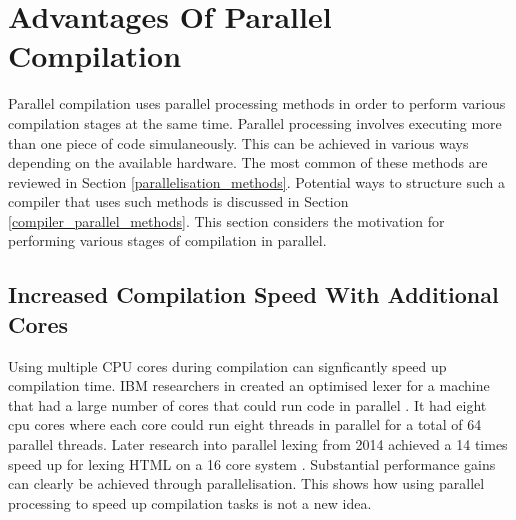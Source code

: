 \section{Advantages Of Parallel Compilation} \label{advantages_parallel_compilation}

Parallel compilation uses parallel processing methods in order to perform
various compilation stages at the same time. Parallel processing involves
executing more than one piece of code simulaneously. This can be achieved in
various ways depending on the available hardware. The most common of these
methods are reviewed in Section \ref{parallelisation_methods}. Potential ways
to structure such a compiler that uses such methods is discussed in Section
\ref{compiler_parallel_methods}. This section considers the motivation for
performing various stages of compilation in parallel.

\subsection{Increased Compilation Speed With Additional Cores}

Using multiple CPU cores during compilation can signficantly speed up
compilation time. IBM researchers in created an optimised lexer for a
machine that had a large number of cores that could run code in parallel
\citep{scarpazza_high-performance_2009}. It had eight cpu cores where each core
could run eight threads in parallel for a total of 64 parallel threads. Later
research into parallel lexing from 2014 achieved a 14 times speed up for lexing
HTML on a 16 core system \citep{mytkowicz_data-parallel_2014}. Substantial
performance gains can clearly be achieved through parallelisation. This shows
how using parallel processing to speed up compilation tasks is not a new
idea.

